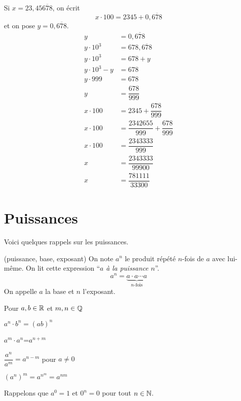 \documentclass[a4paper,12pt]{report}
\begin{document}
\begin{technique}
\begin{minipage}[t]{0.3\textwidth}
{}
\end{minipage}
\hfill
\begin{minipage}[t]{0.3\textwidth}{
\vspace{0pt}
Si $x=23,45\overline{678}$, on écrit \[x\cdot 100=2345+0,\overline{678}\] et on pose $y=0,\overline{678}$. 
\begin{align*}
	y&=0,\overline{678}\\
	y\cdot 10^3&=678,\overline{678}\\
	y\cdot 10^3&=678+y\\
	y\cdot 10^3-y&=678\\
	y\cdot 999&=678\\
	y&=\dfrac{678}{999}\\
	x\cdot 100&=2345+\dfrac{678}{999}\\
	x\cdot 100&=\dfrac{2342655}{999}+\dfrac{678}{999}\\
	x\cdot 100&=\dfrac{2343333}{999}\\
	x&=\dfrac{2343333}{99900}\\
x&=\dfrac{781111}{33300}
\end{align*}
}
\end{minipage}
\end{technique}


\section{Puissances}
Voici quelques rappels sur les puissances. 

\begin{defi}(puissance, base, exposant)
	On note $a^n$ le produit répété $n$-fois de $a$ avec lui-même.
	On lit cette expression \enquote{\emph{$a$ à la puissance $n$}}. 
	\[a^n=\underbrace{a\cdot a\cdots a}_{n\text{-fois}}\]
	On appelle $a$ la base et $n$ l'exposant. 
\end{defi}

\begin{proprietes}
	Pour $a,b\in \mathbb R$ et $m,n\in \mathbb Q$
	\begin{center}

	\begin{inlineumerate}[label={\arabic*)}]
		\item $a^n\cdot b^n=(ab)^n$
		\item $a^m\cdot a^n$=$a^{n+m}$
		\item $\dfrac{a^n}{a^m}=a^{n-m}$ pour $a\neq 0$
		\item $(a^n)^m=a^{n^m}=a^{nm}$
	\end{inlineumerate}
	\end{center}
\end{proprietes}
Rappelons que $a^0=1$ et $0^n=0$ pour tout $n\in \mathbb N$. 
\end{document}
